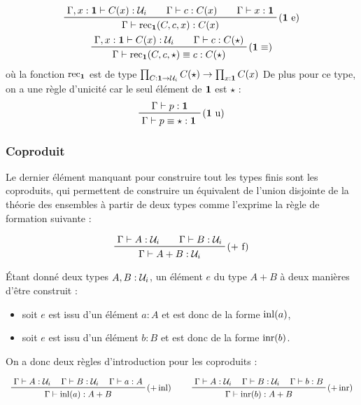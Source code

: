 \documentclass[../../rapport.tex]{subfiles}
\begin{document}
  \begin{gather*}
    \prfinterspace=2em
    \prftree[r]{($\1$ e)}
      {\Gamma, x: \1 \vdash C(x) : \U_i}
      {\Gamma \vdash c : C(x)}
      {\Gamma \vdash x : \1}
    {\Gamma \vdash \rec_{\1}(C, c, x) : C(x)} \\
    \prfinterspace=2em
    \prftree[r]{($\1 \equiv$)}
      {\Gamma, x : \1 \vdash C(x) : \U_i}{\Gamma \vdash c : C(\star)}
    {\Gamma \vdash \rec_{\1}(C, c, \star) \equiv c : C(\star)}
  \end{gather*}
  où la fonction $\operatorname{rec}_{\operatorname{\textbf{1}}}$ est de type $\prod_{C : \operatorname{\textbf{1}} \rightarrow \mathcal U_i} C(\star) \rightarrow \prod_{x:\operatorname{\textbf{1}}} C(x)$
  De plus pour ce type, on a une règle d'unicité car le seul élément de $\operatorname{\textbf{1}}$ est $\star$ :
  $$
  \prfinterspace=2em
  \prftree[r]{($\1$ u)}
    {\Gamma \vdash p : \1}
    {\Gamma \vdash p \equiv \star : \1}
  $$

  \subsubsection{Coproduit}

  Le dernier élément manquant pour construire tout les types finis sont les coproduits,
  qui permettent de construire un équivalent de l'union disjointe de la théorie des ensembles à partir de deux types
  comme l'exprime la règle de formation suivante :

  $$
  \prfinterspace=2em
  \prftree[r]{($+$ f)}{\Gamma \vdash A : \U_i}{\Gamma \vdash B : \U_i}
    {\Gamma \vdash A + B : \U_i}
  $$

  Étant donné deux types $A, B : \mathcal U_i$, un élément $e$ du type $A + B$ à deux manières d'être construit :
  \begin{itemize}
    \item soit $e$ est issu d'un élément $a : A$ et est donc de la forme $\operatorname{inl}(a)$,
    \item soit $e$ est issu d'un élément $b : B$ et est donc de la forme $\operatorname{inr}(b)$.
  \end{itemize}
  On a donc deux règles d'introduction pour les coproduits :

  $$
  \prfinterspace=1.2em
  \begin{array}{cc}
    \prftree[r]{($+ \inl)$}{\Gamma \vdash A : \U_i}{\Gamma \vdash B : \U_i}{\Gamma \vdash a : A}{\Gamma \vdash \inl(a) : A + B} \hspace{0.5cm}
    & \prftree[r]{($+ \inr)$}{\Gamma \vdash A : \U_i}{\Gamma \vdash B : \U_i}{\Gamma \vdash b : B}{\Gamma \vdash \inr(b) : A + B}
  \end{array}
  $$
\end{document}

